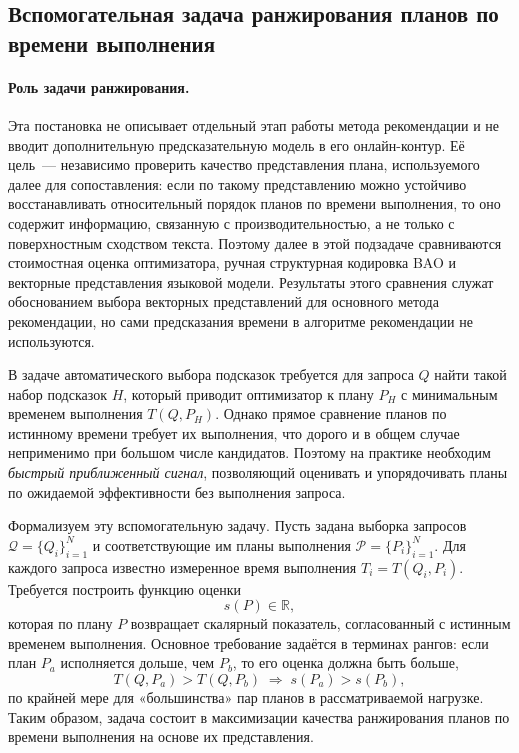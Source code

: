\subsection{Вспомогательная задача ранжирования планов по времени выполнения}
\label{subsec:ranking_problem}

\paragraph{Роль задачи ранжирования.}
Эта постановка не описывает отдельный этап работы метода рекомендации и не вводит дополнительную предсказательную модель в его онлайн-контур. Её цель~--- независимо проверить качество представления плана, используемого далее для сопоставления: если по такому представлению можно устойчиво восстанавливать относительный порядок планов по времени выполнения, то оно содержит информацию, связанную с производительностью, а не только с поверхностным сходством текста. Поэтому далее в этой подзадаче сравниваются стоимостная оценка оптимизатора, ручная структурная кодировка BAO и векторные представления языковой модели. Результаты этого сравнения служат обоснованием выбора векторных представлений для основного метода рекомендации, но сами предсказания времени в алгоритме рекомендации не используются.


В задаче автоматического выбора подсказок требуется для запроса \(Q\) найти такой набор подсказок \(H\), который приводит оптимизатор к плану \(P_H\) с минимальным временем выполнения \(T(Q,P_H)\). Однако прямое сравнение планов по истинному времени требует их выполнения, что дорого и в общем случае неприменимо при большом числе кандидатов. Поэтому на практике необходим \emph{быстрый приближенный сигнал}, позволяющий оценивать и упорядочивать планы по ожидаемой эффективности без выполнения запроса.

Формализуем эту вспомогательную задачу. Пусть задана выборка запросов \(\mathcal{Q}=\{Q_i\}_{i=1}^{N}\) и соответствующие им планы выполнения \(\mathcal{P}=\{P_i\}_{i=1}^{N}\). Для каждого запроса известно измеренное время выполнения \(T_i = T(Q_i,P_i)\). Требуется построить функцию оценки
\begin{equation}
    s(P) \in \mathbb{R},
\end{equation}
которая по плану \(P\) возвращает скалярный показатель, согласованный с истинным временем выполнения. Основное требование задаётся в терминах рангов: если план \(P_a\) исполняется дольше, чем \(P_b\), то его оценка должна быть больше,
\begin{equation}
    \label{eq:rank_monotonicity}
    T(Q,P_a) > T(Q,P_b) \;\Rightarrow\; s(P_a) > s(P_b),
\end{equation}
по крайней мере для «большинства» пар планов в рассматриваемой нагрузке. Таким образом, задача состоит в максимизации качества ранжирования планов по времени выполнения на основе их представления.

